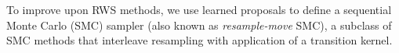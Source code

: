 \documentclass[anonymous=false, %
               format=acmsmall, %
               review=true, %
               screen=true, %
               nonacm=true]{acmart}
\theoremstyle{definition}
\begin{document}
To improve upon RWS methods, we use learned proposals to define a sequential Monte Carlo (SMC) sampler \cite{delmoral2006sequential} (also known as \emph{resample-move} SMC), a subclass of SMC methods \cite{doucet2001sequential} that interleave resampling with application of a transition kernel.

\end{document}
